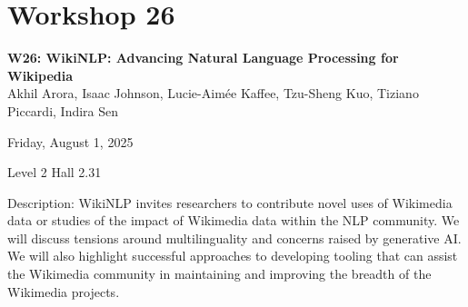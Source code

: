 \clearpage


\section[W26: WikiNLP: Advancing Natural Language Processing for Wikipedia]{Workshop 26}
\label{workshop_26}

\begin{center}
    {\Large \textbf{W26: WikiNLP: Advancing Natural Language Processing for Wikipedia}}\\
    

Akhil Arora, Isaac Johnson, Lucie-Aimée Kaffee, Tzu-Sheng Kuo, Tiziano Piccardi, Indira Sen

    Friday, August 1, 2025

Level 2 Hall 2.31
    
\end{center}

Description: WikiNLP invites researchers to contribute novel uses of Wikimedia data or studies of the impact of Wikimedia data within the NLP community. We will discuss tensions around multilinguality and concerns raised by generative AI. We will also highlight successful approaches to developing tooling that can assist the Wikimedia community in maintaining and improving the breadth of the Wikimedia projects.

